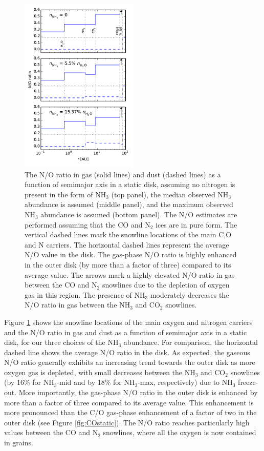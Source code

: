 \documentclass[apj]{emulateapj}
\begin{document}
\begin{figure}[h!]
\centering
\includegraphics[width=0.5\textwidth]{../../figs/N_O_ratio.pdf}
\caption{The N/O ratio in gas (solid lines) and dust (dashed lines) as a function of semimajor axis in a static disk, assuming no nitrogen is present in the form of NH$_3$ (top panel), the median observed NH$_3$ abundance is assumed (middle panel), and the maximum observed NH$_3$ abundance is assumed (bottom panel). The N/O estimates are performed assuming that the CO and N$_2$ ices are in pure form. The vertical dashed lines mark the snowline locations of the main C,O and N carriers. The horizontal dashed lines represent the average N/O value in the disk. The gas-phase N/O ratio is highly enhanced in the outer disk (by more than a factor of three) compared to its average value. The arrows mark a highly elevated N/O ratio in gas between the CO and N$_2$ snowlines due to the depletion of oxygen gas in this region. The presence of NH$_3$ moderately decreases the N/O ratio in gas between the NH$_3$ and CO$_2$ snowlines.} 
\label{fig:Nstatic}
\end{figure}

Figure \ref{fig:Nstatic} shows the snowline locations of the main oxygen and nitrogen carriers and the N/O ratio in gas and dust as a function of semimajor axis in a static disk, for our three choices of the NH$_3$ abundance. For comparison, the horizontal dashed line shows the average N/O ratio in the disk. As expected, the gaseous N/O ratio generally exhibits an increasing trend towards the outer disk as more oxygen gas is depleted, with small decreases between the NH$_3$ and CO$_2$ snowlines (by 16\% for NH$_3$-mid and by 18\% for NH$_3$-max, respectively) due to NH$_3$ freeze-out. More importantly, the gas-phase N/O ratio in the outer disk is enhanced by more than a factor of three compared to its average value. This enhancement is more pronounced than the C/O gas-phase enhancement of a factor of two in the outer disk (see Figure \ref{fig:COstatic}). The N/O ratio reaches particularly high values between the CO and N$_2$ snowlines, where all the oxygen is now contained in grains. 
\end{document}
